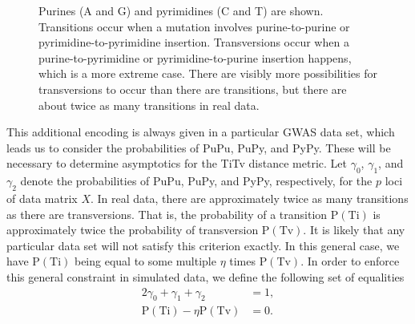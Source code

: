 \documentclass[aos]{imsart}
\begin{document}
\begin{figure}[H]
\begin{minipage}[c]{0.62\textwidth}
\end{minipage}\hfill
\begin{minipage}[c]{0.34\textwidth}
	\caption{Purines (A and G) and pyrimidines (C and T) are shown. Transitions occur when a mutation involves purine-to-purine or pyrimidine-to-pyrimidine insertion. Transversions occur when a purine-to-pyrimidine or pyrimidine-to-purine insertion happens, which is a more extreme case. There are visibly more possibilities for transversions to occur than there are transitions, but there are about twice as many transitions in real data.}\label{fig:TiTv_diagram}
\end{minipage}
\end{figure}

This additional encoding is always given in a particular GWAS data set, which leads us to consider the probabilities of PuPu, PuPy, and PyPy. These will be necessary to determine asymptotics for the TiTv distance metric. Let $\gamma_0$, $\gamma_1$, and $\gamma_2$ denote the probabilities of PuPu, PuPy, and PyPy, respectively, for the $p$ loci of data matrix $X$. In real data, there are approximately twice as many transitions as there are transversions. That is, the probability of a transition $\text{P}(\text{Ti})$ is approximately twice the probability of transversion $\text{P}(\text{Tv})$. It is likely that any particular data set will not satisfy this criterion exactly. In this general case, we have $\text{P}(\text{Ti})$ being equal to some multiple $\eta$ times $\text{P}(\text{Tv})$. In order to enforce this general constraint in simulated data, we define the following set of equalities
%
\begin{alignat}{2}\label{eq:TiTv_constraints1}
\gamma_0 + \gamma_1 + \gamma_2 &= 1, \\ \label{eq:TiTv_constraints2}
\text{P}(\text{Ti}) - \eta \text{P}(\text{Tv}) &= 0.
\end{alignat}
\end{document}
